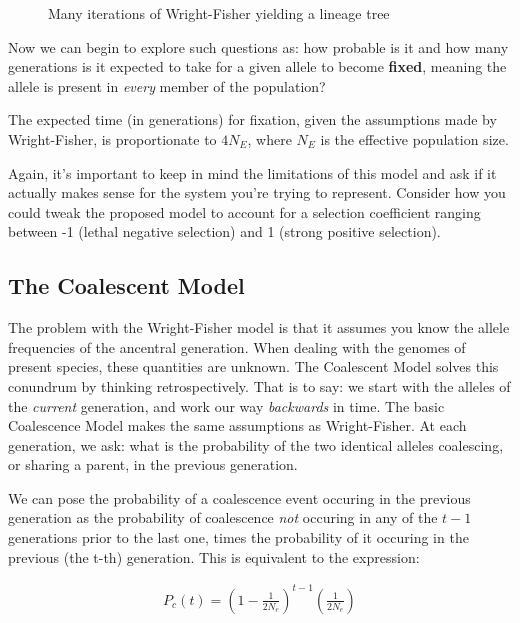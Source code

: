 \begin{figure} [h] 
  \centering 
  \caption{Many iterations of Wright-Fisher yielding a lineage tree}
  \label{Fig14_FisherWrightManyGenerations}
\end{figure}

Now we can begin to explore such questions as: how probable is it and how many generations is it expected to take for a given allele to become \textbf{fixed}, meaning the allele is present in \textit{every} member of the population?

The expected time (in generations) for fixation, given the assumptions made by Wright-Fisher, is proportionate to $4N_{E}$, where $N_{E}$ is the effective population size.

Again, it's important to keep in mind the limitations of this model and ask if it actually makes sense for the system you're trying to represent. Consider how you could tweak the proposed model to account for a selection coefficient ranging between -1 (lethal negative selection) and 1 (strong positive selection).


\subsection{The Coalescent Model}

The problem with the Wright-Fisher model is that it assumes you know the allele frequencies of the ancentral generation. When dealing with the genomes of present species, these quantities are unknown. The Coalescent Model solves this conundrum by thinking retrospectively. That is to say: we start with the alleles of the \textit{current} generation, and work our way \textit{backwards} in time. The basic Coalescence Model makes the same assumptions as Wright-Fisher. At each generation, we ask: what is the probability of the two identical alleles coalescing, or sharing a parent, in the previous generation.

We can pose the probability of a coalescence event occuring in the previous generation as the probability of coalescence \textit{not} occuring in any of the $t-1$ generations prior to the last one, times the probability of it occuring in the previous (the t-th) generation. This is equivalent to the expression:

\begin{align}
P_c(t) = \left(1-\frac{1}{2N_e}\right)^{t-1} \left(\frac{1}{2N_e}\right)
\end{align}

